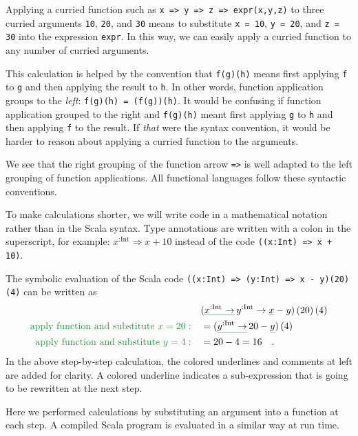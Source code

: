 Applying a curried function such as \lstinline!x => y => z => expr(x,y,z)!
to three curried arguments \lstinline!10!, \lstinline!20!, and \lstinline!30!
means to substitute \lstinline!x = 10!, \lstinline!y = 20!, and
\lstinline!z = 30! into the expression \lstinline!expr!. In this
way, we can easily apply a curried function to any number of curried
arguments.

This calculation is helped by the convention that \lstinline!f(g)(h)!
means first applying \lstinline!f! to \lstinline!g! and then applying
the result to \lstinline!h!. In other words, function application
groups to the \emph{left}: \lstinline!f(g)(h) = (f(g))(h)!. It would
be confusing if function application grouped to the right and \lstinline!f(g)(h)!
meant first applying \lstinline!g! to \lstinline!h! and then applying
\lstinline!f! to the result. If \emph{that} were the syntax convention,
it would be harder to reason about applying a curried function to
the arguments.

We see that the right grouping of the function arrow \lstinline!=>!
is well adapted to the left grouping of function applications. All
functional languages follow these syntactic conventions.

To make calculations shorter, we will write code in a mathematical
notation rather than in the Scala syntax. Type annotations are written
with a colon in the superscript, for example: $x^{:\text{Int}}\Rightarrow x+10$
instead of the code \lstinline!((x:Int) => x + 10)!.

The symbolic evaluation of the Scala code \lstinline!((x:Int) => (y:Int) => x - y)(20)(4)!
can be written as
\begin{align*}
 & (\gunderline{x^{:\text{Int}}\Rightarrow}\,y^{:\text{Int}}\Rightarrow\gunderline x-y)\left(20\right)\left(4\right)\\
{\color{greenunder}\text{apply function and substitute }x=20:}\quad & =(\gunderline{y^{:\text{Int}}\Rightarrow}\,20-\gunderline y)\left(4\right)\\
{\color{greenunder}\text{apply function and substitute }y=4:}\quad & =20-4=16\quad.
\end{align*}
In the above step-by-step calculation, the colored underlines and
comments at left are added for clarity. A colored underline indicates
a sub-expression that is going to be rewritten at the next step.

Here we performed calculations by substituting an argument into a
function at each step. A compiled Scala program is evaluated in a
similar way at run time.

